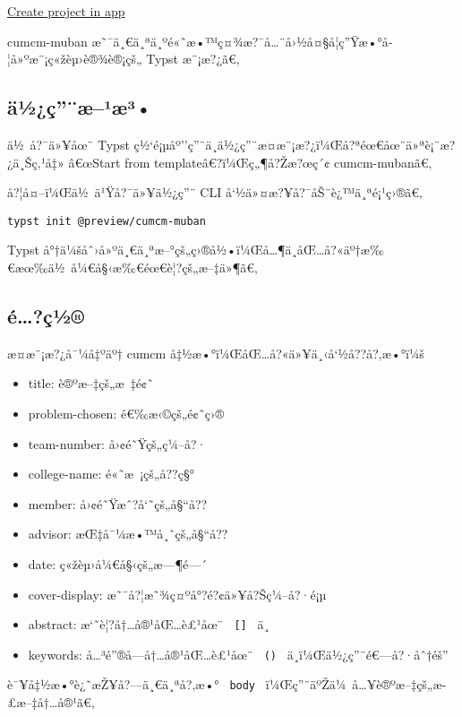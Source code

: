 \href{/app?template=cumcm-muban&version=0.3.0}{Create project in app}

\label{readme}
cumcm-muban
æ˜¯ä¸€ä¸ªä¸ºé«˜æ•™ç¤¾æ?¯å\ldots¨å›½å¤§å­¦ç''Ÿæ•°å­¦å»ºæ¨¡ç«žèµ›è®¾è®¡çš„
Typst æ¨¡æ?¿ã€‚

\subsection{ä½¿ç''¨æ--¹æ³•}\label{uxe4uxbduxe7uxe6uxb9uxe6uxb3}

ä½~å?¯ä»¥åœ¨ Typst
ç½`é¡µåº''ç''¨ä¸­ä½¿ç''¨æ­¤æ¨¡æ?¿ï¼Œå?ªéœ€åœ¨ä»ªè¡¨æ?¿ä¸Šç‚¹å‡» â€œStart
from templateâ€?ï¼Œç„¶å?Žæ?œç´¢ cumcm-mubanã€‚

å?¦å¤--ï¼Œä½~ä¹Ÿå?¯ä»¥ä½¿ç''¨ CLI å`½ä»¤æ?¥å?¯åŠ¨è¿™ä¸ªé¡¹ç›®ã€‚

\begin{verbatim}
typst init @preview/cumcm-muban
\end{verbatim}

Typst
å°†ä¼šåˆ›å»ºä¸€ä¸ªæ--°çš„ç›®å½•ï¼Œå\ldots¶ä¸­åŒ\ldots å?«äº†æ‰€æœ‰ä½~å¼€å§‹æ‰€éœ€è¦?çš„æ--‡ä»¶ã€‚

\subsection{é\ldots?ç½®}\label{uxe9uxe7uxbd}

æ­¤æ¨¡æ?¿å¯¼å‡ºäº† cumcm å‡½æ•°ï¼ŒåŒ\ldots å?«ä»¥ä¸‹å`½å??å?‚æ•°ï¼š

\begin{itemize}
\tightlist
\item
  title: è®ºæ--‡çš„æ~‡é¢˜
\item
  problem-chosen: é€‰æ‹©çš„é¢˜ç›®
\item
  team-number: å›¢é˜Ÿçš„ç¼--å?·
\item
  college-name: é«˜æ~¡çš„å??ç§°
\item
  member: å›¢é˜Ÿæˆ?å`˜çš„å§``å??
\item
  advisor: æŒ‡å¯¼æ•™å¸ˆçš„å§``å??
\item
  date: ç«žèµ›å¼€å§‹çš„æ---¶é---´
\item
  cover-display: æ˜¯å?¦æ˜¾ç¤ºå°?é?¢ä»¥å?Šç¼--å?·é¡µ
\item
  abstract: æ`˜è¦?å†\ldots å®¹åŒ\ldots è£¹åœ¨ \texttt{\ {[}{]}\ } ä¸­
\item
  keywords: å\ldots³é''®å­---å†\ldots å®¹åŒ\ldots è£¹åœ¨ \texttt{\ ()\ }
  ä¸­ï¼Œä½¿ç''¨é€---å?·åˆ†éš''
\end{itemize}

è¯¥å‡½æ•°è¿˜æŽ¥å?---ä¸€ä¸ªå?‚æ•° \texttt{\ body\ }
ï¼Œç''¨äºŽä¼~å\ldots¥è®ºæ--‡çš„æ­£æ--‡å†\ldots å®¹ã€‚

